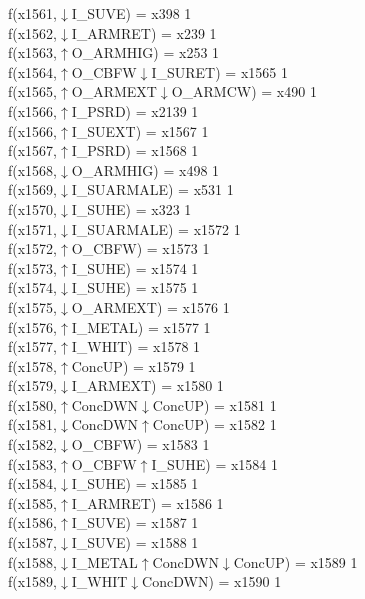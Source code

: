f(x1561,$\downarrow$I\_SUVE) = x398 {1} \\
f(x1562,$\downarrow$I\_ARMRET) = x239 {1} \\
f(x1563,$\uparrow$O\_ARMHIG) = x253 {1} \\
f(x1564,$\uparrow$O\_CBFW$\downarrow$I\_SURET) = x1565 {1} \\
f(x1565,$\uparrow$O\_ARMEXT$\downarrow$O\_ARMCW) = x490 {1} \\
f(x1566,$\uparrow$I\_PSRD) = x2139 {1} \\
f(x1566,$\uparrow$I\_SUEXT) = x1567 {1} \\
f(x1567,$\uparrow$I\_PSRD) = x1568 {1} \\
f(x1568,$\downarrow$O\_ARMHIG) = x498 {1} \\
f(x1569,$\downarrow$I\_SUARMALE) = x531 {1} \\
f(x1570,$\downarrow$I\_SUHE) = x323 {1} \\
f(x1571,$\downarrow$I\_SUARMALE) = x1572 {1} \\
f(x1572,$\uparrow$O\_CBFW) = x1573 {1} \\
f(x1573,$\uparrow$I\_SUHE) = x1574 {1} \\
f(x1574,$\downarrow$I\_SUHE) = x1575 {1} \\
f(x1575,$\downarrow$O\_ARMEXT) = x1576 {1} \\
f(x1576,$\uparrow$I\_METAL) = x1577 {1} \\
f(x1577,$\uparrow$I\_WHIT) = x1578 {1} \\
f(x1578,$\uparrow$ConcUP) = x1579 {1} \\
f(x1579,$\downarrow$I\_ARMEXT) = x1580 {1} \\
f(x1580,$\uparrow$ConcDWN$\downarrow$ConcUP) = x1581 {1} \\
f(x1581,$\downarrow$ConcDWN$\uparrow$ConcUP) = x1582 {1} \\
f(x1582,$\downarrow$O\_CBFW) = x1583 {1} \\
f(x1583,$\uparrow$O\_CBFW$\uparrow$I\_SUHE) = x1584 {1} \\
f(x1584,$\downarrow$I\_SUHE) = x1585 {1} \\
f(x1585,$\uparrow$I\_ARMRET) = x1586 {1} \\
f(x1586,$\uparrow$I\_SUVE) = x1587 {1} \\
f(x1587,$\downarrow$I\_SUVE) = x1588 {1} \\
f(x1588,$\downarrow$I\_METAL$\uparrow$ConcDWN$\downarrow$ConcUP) = x1589 {1} \\
f(x1589,$\downarrow$I\_WHIT$\downarrow$ConcDWN) = x1590 {1} \\
